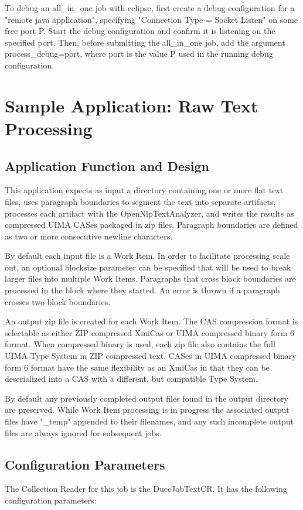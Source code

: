 To debug an all\_in\_one job with eclipse, first create a debug configuration for a
"remote java application", specifying "Connection Type = Socket Listen" on some
free port P. Start the debug configuration and confirm it is listening on the specified port.
Then, before submitting the all\_in\_one job, add the argument process\_debug=port, 
where port is the value P used in the running debug configuration.


\chapter{Sample Application: Raw Text Processing}

\section{Application Function and Design}
This application expects as input a directory containing one or more flat text files, 
uses paragraph boundaries to segment the text into separate artifacts, 
processes each artifact with the OpenNlpTextAnalyzer, and writes
the results as compressed UIMA CASes packaged in zip files. Paragraph boundaries are defined as
two or more consecutive newline characters.

By default each input file is a Work Item. In order to facilitate processing scale out, 
an optional blocksize parameter can be specified that will be used to break larger 
files into multiple Work Items. Paragraphs that cross block boundaries are processed
in the block where they started. An error is thrown if a paragraph crosses two block
boundaries.

An output zip file is created for each Work Item. The CAS compression format is selectable as
either ZIP compressed XmiCas or UIMA compressed binary form 6 format. When compressed binary
is used, each zip file also contains the full UIMA Type System in ZIP compressed text.
CASes in UIMA compressed binary form 6 format have the same flexibility as an XmiCas in that
they can be deserialized into a CAS with a different, but compatible Type System.

By default any previously completed output files found in the output directory are preserved.
While Work Item processing is in progress the associated output files have "\_temp" appended to their
filenames, and any such incomplete output files are always ignored for subsequent jobs.

\section{Configuration Parameters}
The Collection Reader for this job is the DuccJobTextCR. It has the following configuration
parameters:

